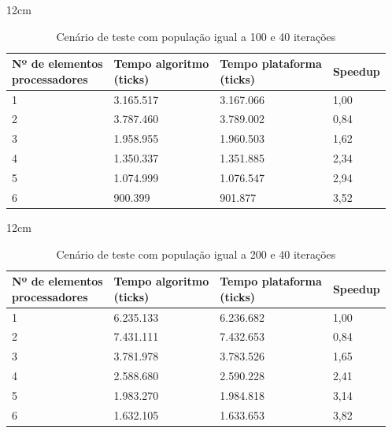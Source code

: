 
\begin{table}[h]{12cm}
    \caption{Cenário de teste com população igual a 100 e 40 iterações}
    \label{cenario11}
    \begin{tabular}{llll}
        \hline
        \shortstack[l]{Nº de elementos \\ processadores} & \shortstack[l]{Tempo algoritmo \\ (ticks)} & \shortstack[l]{Tempo plataforma \\ (ticks)} & Speedup \\
        \hline
        1 & 3.165.517 & 3.167.066 & 1,00 \\
        2 & 3.787.460 & 3.789.002 & 0,84 \\
        3 & 1.958.955 & 1.960.503 &	1,62 \\
        4 & 1.350.337 & 1.351.885 & 2,34 \\
        5 & 1.074.999 & 1.076.547 & 2,94 \\
        6 & 900.399   & 901.877   & 3,52 \\
        \hline
    \end{tabular}
\end{table}

\begin{table}[h]{12cm}
    \caption{Cenário de teste com população igual a 200 e 40 iterações}
    \label{cenario12}
    \begin{tabular}{llll}
        \hline
        \shortstack[l]{Nº de elementos \\ processadores} & \shortstack[l]{Tempo algoritmo \\ (ticks)} & \shortstack[l]{Tempo plataforma \\ (ticks)} & Speedup \\
        \hline
        1 & 6.235.133 & 6.236.682 & 1,00 \\
        2 & 7.431.111 & 7.432.653 & 0,84 \\
        3 & 3.781.978 & 3.783.526 &	1,65 \\
        4 & 2.588.680 & 2.590.228 & 2,41 \\
        5 & 1.983.270 & 1.984.818 & 3,14 \\
        6 & 1.632.105 & 1.633.653 & 3,82 \\
        \hline
    \end{tabular}
\end{table}

